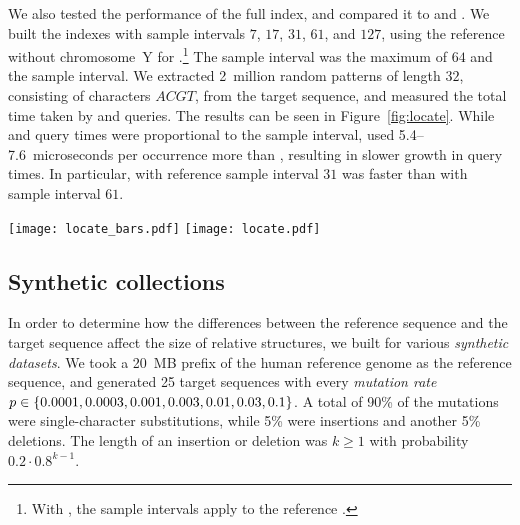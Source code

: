 We also tested the \locate{} performance of the full \RFM{} index, and
compared it to \SSA{} and \SSArrr. We built the indexes with \SA{} sample
intervals $7$, $17$, $31$, $61$, and $127$, using the reference without
chromosome~Y for \RFM.\footnote{With \RFM, the sample intervals apply
to the reference \SSA.} The \ISA{} sample interval was the
maximum of $64$ and the \SA{} sample interval. We extracted 2~million
random patterns of length $32$, consisting of characters $ACGT$, from
the target sequence, and measured the total time taken by \find{} and
\locate{} queries. The results can be seen in
Figure~\ref{fig:locate}. While \SSA{} and \SSArrr{} query times were
proportional to the sample interval, \RFM{} used 5.4\nobreakdash--7.6~microseconds
per occurrence more than \SSA{}, resulting in slower growth in query times.
In particular, \RFM{} with reference sample interval $31$ was faster than
\SSA{} with sample interval $61$.

\begin{figure*}
\begin{center}
\texttt{[image: locate\_bars.pdf]}%
\hspace{-0.6in}%
\texttt{[image: locate.pdf]}
\end{center}
\caption{Average \find{} and \locate{} times in microseconds per occurrence for 2~million patterns
of length $32$ with a total of 255~million occurrences on NA12878 relative to
the human reference genome without chromosome~Y. Left: Query time vs.\ suffix array
sample interval. Right: Query time vs.\ index size in bits per character.}\label{fig:locate}
\end{figure*}

\subsection{Synthetic collections}

In order to determine how the differences between the reference sequence and
the target sequence affect the size of relative structures, we built \RCST{}
for various \emph{synthetic datasets}. We took a 20~MB prefix of the human
reference genome as the reference sequence, and generated 25 target
sequences with every \emph{mutation rate} $p \in \{ 0.0001, 0.0003, 0.001, 0.003,
0.01, 0.03, 0.1 \}$. A total of 90\% of the mutations were single-character
substitutions, while 5\% were insertions and another 5\% deletions. The length of an
insertion or deletion was $k \ge 1$ with probability $0.2 \cdot 0.8^{k-1}$.

